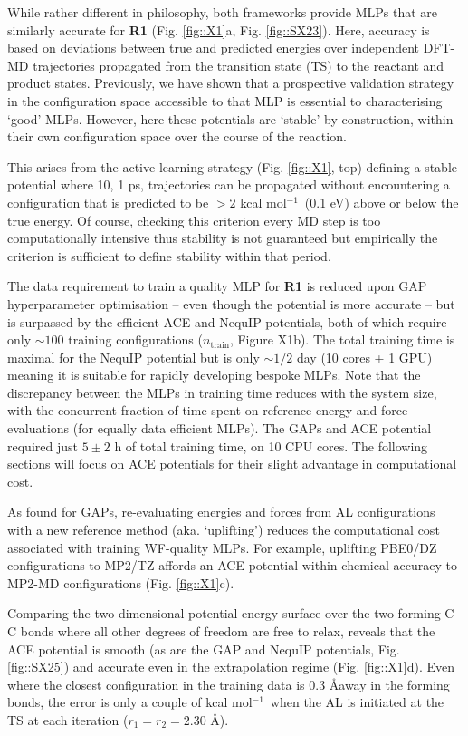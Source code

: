 \documentclass[twoside,twocolumn,9pt]{article}
\newcommand{\kcal}{kcal mol$^{-1}$}
\begin{document}
While rather different in philosophy, both frameworks provide MLPs that are similarly accurate for {\bfseries{R1}} (Fig. \ref{fig::X1}a, Fig. \ref{fig::SX23}). Here, accuracy is based on deviations between true and predicted energies over independent DFT-MD trajectories propagated from the transition state (TS) to the reactant and product states. Previously, we have shown that a prospective validation strategy in the configuration space accessible to that MLP is essential to characterising `good’ MLPs.\cite{Young2021gap} However, here these potentials are `stable’ by construction, within their own configuration space over the course of the reaction.

This arises from the active learning strategy (Fig. \ref{fig::X1}, top) defining a stable potential where 10, 1 ps, trajectories can be propagated without encountering a configuration that is predicted to be $>2$ \kcal~(0.1 eV) above or below the true energy. Of course, checking this criterion every MD step is too computationally intensive thus stability is not guaranteed but empirically the criterion is sufficient to define stability within that period.

The data requirement to train a quality MLP for {\bfseries{R1}} is reduced upon GAP hyperparameter optimisation – even though the potential is more accurate – but is surpassed by the efficient ACE and NequIP potentials, both of which require only $\sim100$ training configurations ($n_\text{train}$, Figure X1b). The total training time is maximal for the NequIP potential but is only $\sim1/2$ day (10 cores + 1 GPU) meaning it is suitable for rapidly developing bespoke MLPs. Note that the discrepancy between the MLPs in training time reduces with the system size, with the concurrent fraction of time spent on reference energy and force evaluations (for equally data efficient MLPs). The GAPs and ACE potential required just $5\pm2$ h of total training time, on 10 CPU cores. The following sections will focus on ACE potentials for their slight advantage in computational cost.

As found for GAPs, re-evaluating energies and forces from AL configurations with a new reference method (aka. `uplifting’) reduces the computational cost associated with training WF-quality MLPs. For example, uplifting PBE0/DZ configurations to MP2/TZ affords an ACE potential within chemical accuracy to MP2-MD configurations (Fig. \ref{fig::X1}c).

Comparing the two-dimensional potential energy surface over the two forming C–C bonds where all other degrees of freedom are free to relax, reveals that the ACE potential is smooth (as are the GAP and NequIP potentials, Fig. \ref{fig::SX25}) and accurate even in the extrapolation regime (Fig. \ref{fig::X1}d). Even where the closest configuration in the training data is 0.3 \AA away in the forming bonds, the error is only a couple of \kcal~when the AL is initiated at the TS at each iteration ($r_1=r_2=2.30$ \AA).
\end{document}
